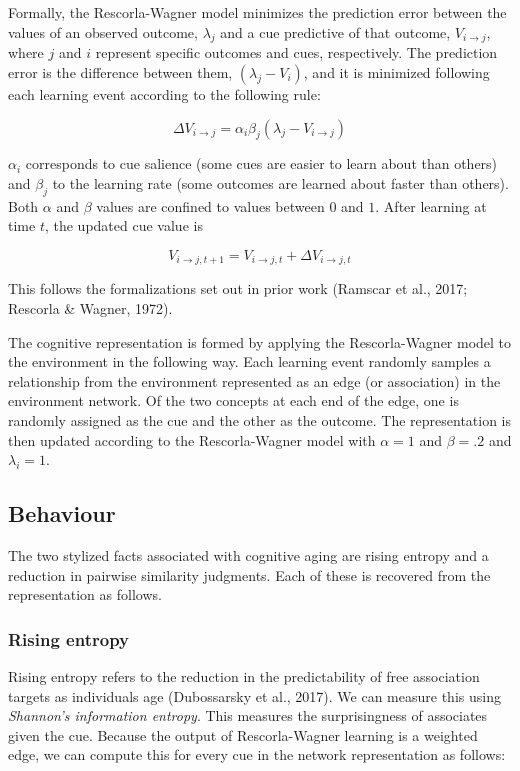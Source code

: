 \documentclass[
  man]{apa6}
\begin{document}
Formally, the Rescorla-Wagner model minimizes the prediction error between the values of an observed outcome, \(\lambda_j\) and a cue predictive of that outcome, \(V_{i \rightarrow j}\), where \(j\) and \(i\) represent specific outcomes and cues, respectively. The prediction error is the difference between them, \((\lambda_j-V_i)\), and it is minimized following each learning event according to the following rule:

\[
\Delta V_{i \rightarrow j} = \alpha_i \beta_j (\lambda_{j} - V_{i \rightarrow j})
\]

\(\alpha_i\) corresponds to cue salience (some cues are easier to learn about than others) and \(\beta_j\) to the learning rate (some outcomes are learned about faster than others). Both \(\alpha\) and \(\beta\) values are confined to values between \(0\) and \(1\). After learning at time \(t\), the updated cue value is

\[
V_{i \rightarrow j, t+1} = V_{i \rightarrow j, t} + \Delta V_{i \rightarrow j, t}
\]

This follows the formalizations set out in prior work (Ramscar et al., 2017; Rescorla \& Wagner, 1972).

The cognitive representation is formed by applying the Rescorla-Wagner model to the environment in the following way. Each learning event randomly samples a relationship from the environment represented as an edge (or association) in the environment network. Of the two concepts at each end of the edge, one is randomly assigned as the cue and the other as the outcome. The representation is then updated according to the Rescorla-Wagner model with \(\alpha=1\) and \(\beta=.2\) and \(\lambda_i=1\).

\hypertarget{behaviour}{%
\subsection{Behaviour}\label{behaviour}}

The two stylized facts associated with cognitive aging are rising entropy and a reduction in pairwise similarity judgments. Each of these is recovered from the representation as follows.

\hypertarget{rising-entropy}{%
\subsubsection{Rising entropy}\label{rising-entropy}}

Rising entropy refers to the reduction in the predictability of free association targets as individuals age (Dubossarsky et al., 2017). We can measure this using \emph{Shannon's information entropy}. This measures the surprisingness of associates given the cue. Because the output of Rescorla-Wagner learning is a weighted edge, we can compute this for every cue in the network representation as follows:
\end{document}
